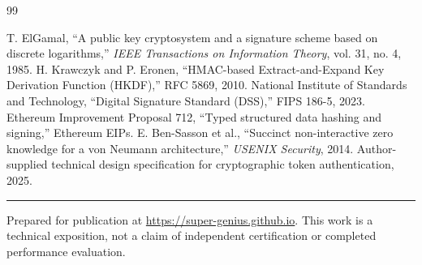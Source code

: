 \documentclass[10pt,letterpaper]{article}
\begin{document}
\vspace{6pt}
\begin{thebibliography}{99}

 T. ElGamal, ``A public key cryptosystem and a signature scheme based on discrete logarithms,'' \emph{IEEE Transactions on Information Theory}, vol. 31, no. 4, 1985.
 H. Krawczyk and P. Eronen, ``HMAC-based Extract-and-Expand Key Derivation Function (HKDF),'' RFC 5869, 2010.
 National Institute of Standards and Technology, ``Digital Signature Standard (DSS),'' FIPS 186-5, 2023.
 Ethereum Improvement Proposal 712, ``Typed structured data hashing and signing,'' Ethereum EIPs.
 E. Ben-Sasson et al., ``Succinct non-interactive zero knowledge for a von Neumann architecture,'' \emph{USENIX Security}, 2014.
 Author-supplied technical design specification for cryptographic token authentication, 2025.

\end{thebibliography}
\vspace{6pt}
\noindent\rule{\textwidth}{0.3pt}
\noindent\footnotesize Prepared for publication at \url{https://super-genius.github.io}. This work is a technical exposition, not a claim of independent certification or completed performance evaluation.
\end{document}
